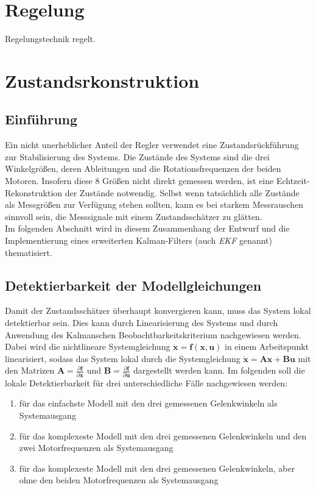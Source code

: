 \documentclass[times, 10pt,twocolumn]{article}
\begin{document}
	
	\section{Regelung}
	Regelungstechnik regelt. 
	
	\newpage
	\section{Zustandsrkonstruktion}
	\subsection{Einf\"uhrung}
	Ein nicht unerheblicher Anteil der Regler verwendet eine Zustandsr\"uckf\"uhrung zur Stabilisierung des Systems. Die Zust\"ande des Systems sind die drei Winkelgr\"oßen, deren Ableitungen und die Rotationsfrequenzen der beiden Motoren. Insofern diese 8 Gr\"oßen nicht direkt gemessen werden, ist eine Echtzeit-Rekonstruktion der Zustände notwendig. 
	Selbst wenn tatsächlich alle Zustände als Messgrößen zur Verfügung stehen sollten, kann es bei starkem Messrauschen sinnvoll sein, die Messsignale mit einem Zustandsschätzer zu glätten. \\
	Im folgenden Abschnitt wird in diesem Zusammenhang der Entwurf und die Implementierung eines erweiterten Kalman-Filters (auch \textit{EKF} genannt)  thematisiert. 
	\subsection{Detektierbarkeit der Modellgleichungen}
	Damit der Zustandsschätzer überhaupt konvergieren kann, muss das System lokal detektierbar sein. Dies kann durch Linearisierung des Systems und durch Anwendung des Kalmanschen Beobachtbarkeitskriterium nachgewiesen werden. Dabei wird die nichtlineare Systemgleichung  $ \bm{\dot x} = \bm{f}(\bm{x},\bm{u}) $ in einem Arbeitspunkt linearisiert, sodass das System lokal durch die Systemgleichung $ \bm{\dot x} = \bm{A} \bm{x} + \bm{B} \bm{u} $ mit den Matrizen $ \bm A = \frac{\partial{ \bm f}}{\partial{\bm x}} $ und $ \bm B = \frac{\partial{ \bm f}}{\partial{\bm u}} $ dargestellt werden kann. Im folgenden soll die lokale Detektierbarkeit für drei unterschiedliche Fälle nachgewiesen werden:
	\begin{enumerate}
	\item für das einfachste Modell mit den drei gemessenen Gelenkwinkeln als Systemausgang
	\item für das komplexeste Modell mit den drei gemessenen Gelenkwinkeln und den zwei Motorfrequenzen als Systemausgang
	\item für das komplexeste Modell mit den drei gemessenen Gelenkwinkeln, aber ohne den beiden Motorfrequenzen als Systemausgang
	\end{enumerate}
	
\end{document}
